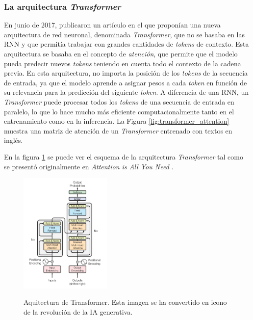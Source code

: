 \subsubsection{La arquitectura \textit{Transformer}}
En junio de 2017, \citeauthor{vaswaniAttentionAllYou2017} publicaron un artículo \citep{vaswaniAttentionAllYou2017} en el que proponían una nueva arquitectura de red neuronal, denominada \textit{Transformer}, que no se basaba en las RNN y que permitía trabajar con grandes cantidades de \textit{tokens} de contexto. Esta arquitectura se basaba en el concepto de \textit{atención}, que permite que el modelo pueda predecir nuevos \textit{tokens} teniendo en cuenta todo el contexto de la cadena previa. En esta arquitectura, no importa la posición de los \textit{tokens} de la secuencia de entrada, ya que el modelo aprende a asignar pesos a cada \textit{token} en función de su relevancia para la predicción del siguiente \textit{token}. A diferencia de una RNN, un \textit{Transformer} puede procesar todos los \textit{tokens} de una secuencia de entrada en paralelo, lo que lo hace mucho más eficiente computacionalmente tanto en el entrenamiento como en la inferencia. La Figura \ref{fig:transformer_attention} muestra una matriz de atención de un \textit{Transformer} entrenado con textos en inglés.

En la figura \ref{fig:transformer_architecture} se puede ver el esquema de la arquitectura \textit{Transformer} tal como se presentó originalmente en \textit{Attention is All You Need} \cite{vaswaniAttentionAllYou2017}.

\begin{figure}[H]
    \caption[Aquitectura de Transformer]{Aquitectura de Transformer. Esta imagen se ha convertido en icono de la revolución de la IA generativa.}
    \centering
    \includegraphics[width=0.4\textwidth]{./figuras/Transformer_architecture.png}
    \label{fig:transformer_architecture}
\end{figure}

